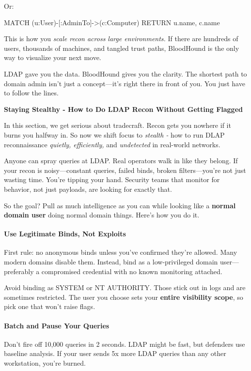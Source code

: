 Or:

MATCH (u:User)-[:AdminTo]->(c:Computer) RETURN u.name, c.name

This is how you \textit{scale recon across large environments.} If there are hundreds of users, thousands of machines, and tangled trust paths, BloodHound is the only way to visualize your next move.

LDAP gave you the data. BloodHound gives you the clarity. The shortest path to domain admin isn’t just a concept—it’s right there in front of you. You just have to follow the lines.

\textbf{Staying Stealthy - How to Do LDAP Recon Without Getting Flagged}

In this section, we get serious about tradecraft. Recon gets you nowhere if it burns you halfway in. So now we shift focus to \textit{stealth - }how to run DLAP reconnaissance \textit{quietly, efficiently, }and \textit{undetected }in real-world networks.

Anyone can spray queries at LDAP. Real operators walk in like they belong. If your recon is noisy—constant queries, failed binds, broken filters—you’re not just wasting time. You’re tipping your hand. Security teams that monitor for behavior, not just payloads, are looking for exactly that.

So the goal? Pull as much intelligence as you can while looking like a \textbf{normal domain user} doing normal domain things. Here’s how you do it.

\paragraph{\textbf{   Use Legitimate Binds, Not Exploits}}

First rule: no anonymous binds unless you’ve confirmed they’re allowed. Many modern domains disable them. Instead, bind as a low-privileged domain user—preferably a compromised credential with no known monitoring attached.

Avoid binding as SYSTEM or NT AUTHORITY. Those stick out in logs and are sometimes restricted. The user you choose sets your \textbf{entire visibility scope}, so pick one that won’t raise flags.

\paragraph{\textbf{   Batch and Pause Your Queries}}

Don’t fire off 10,000 queries in 2 seconds. LDAP might be fast, but defenders use baseline analysis. If your user sends 5x more LDAP queries than any other workstation, you’re burned.

